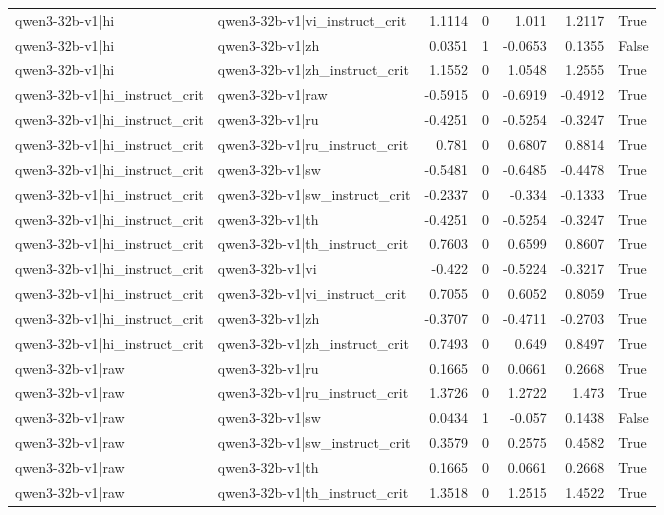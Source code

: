 \begin{table}
\begin{tabular}{l l r r r r l}
qwen3-32b-v1|hi & qwen3-32b-v1|vi_instruct_crit & 1.1114 & 0 & 1.011 & 1.2117 & True \\
qwen3-32b-v1|hi & qwen3-32b-v1|zh & 0.0351 & 1 & -0.0653 & 0.1355 & False \\
qwen3-32b-v1|hi & qwen3-32b-v1|zh_instruct_crit & 1.1552 & 0 & 1.0548 & 1.2555 & True \\
qwen3-32b-v1|hi_instruct_crit & qwen3-32b-v1|raw & -0.5915 & 0 & -0.6919 & -0.4912 & True \\
qwen3-32b-v1|hi_instruct_crit & qwen3-32b-v1|ru & -0.4251 & 0 & -0.5254 & -0.3247 & True \\
qwen3-32b-v1|hi_instruct_crit & qwen3-32b-v1|ru_instruct_crit & 0.781 & 0 & 0.6807 & 0.8814 & True \\
qwen3-32b-v1|hi_instruct_crit & qwen3-32b-v1|sw & -0.5481 & 0 & -0.6485 & -0.4478 & True \\
qwen3-32b-v1|hi_instruct_crit & qwen3-32b-v1|sw_instruct_crit & -0.2337 & 0 & -0.334 & -0.1333 & True \\
qwen3-32b-v1|hi_instruct_crit & qwen3-32b-v1|th & -0.4251 & 0 & -0.5254 & -0.3247 & True \\
qwen3-32b-v1|hi_instruct_crit & qwen3-32b-v1|th_instruct_crit & 0.7603 & 0 & 0.6599 & 0.8607 & True \\
qwen3-32b-v1|hi_instruct_crit & qwen3-32b-v1|vi & -0.422 & 0 & -0.5224 & -0.3217 & True \\
qwen3-32b-v1|hi_instruct_crit & qwen3-32b-v1|vi_instruct_crit & 0.7055 & 0 & 0.6052 & 0.8059 & True \\
qwen3-32b-v1|hi_instruct_crit & qwen3-32b-v1|zh & -0.3707 & 0 & -0.4711 & -0.2703 & True \\
qwen3-32b-v1|hi_instruct_crit & qwen3-32b-v1|zh_instruct_crit & 0.7493 & 0 & 0.649 & 0.8497 & True \\
qwen3-32b-v1|raw & qwen3-32b-v1|ru & 0.1665 & 0 & 0.0661 & 0.2668 & True \\
qwen3-32b-v1|raw & qwen3-32b-v1|ru_instruct_crit & 1.3726 & 0 & 1.2722 & 1.473 & True \\
qwen3-32b-v1|raw & qwen3-32b-v1|sw & 0.0434 & 1 & -0.057 & 0.1438 & False \\
qwen3-32b-v1|raw & qwen3-32b-v1|sw_instruct_crit & 0.3579 & 0 & 0.2575 & 0.4582 & True \\
qwen3-32b-v1|raw & qwen3-32b-v1|th & 0.1665 & 0 & 0.0661 & 0.2668 & True \\
qwen3-32b-v1|raw & qwen3-32b-v1|th_instruct_crit & 1.3518 & 0 & 1.2515 & 1.4522 & True \\

\end{tabular}
\end{table}
